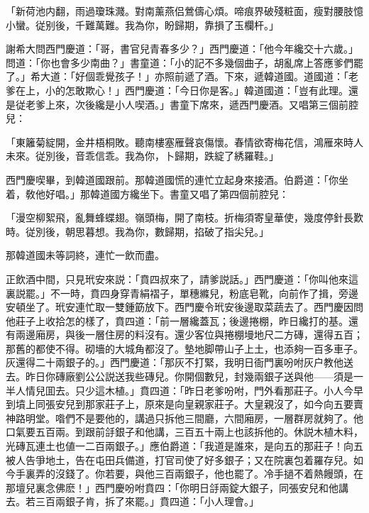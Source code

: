 \begin{myquote}
「新荷池内翻，雨過瓊珠濺。對南薰燕侣鶯儔心煩。啼痕界破殘粧面，瘦對腰肢憶小蠻。従别後，千難萬難。我為你，盼歸期，靠損了玉欄杆。」
\end{myquote}

謝希大問西門慶道：「哥，書官兒青春多少？」西門慶道：「他今年纔交十六歲。」問道：「你也會多少南曲？」書童道：「小的記不多幾個曲子，胡亂席上答應爹們罷了。」希大道：「好個乖覺孩子！」亦照前遞了酒。下來，遞韓道國。道國道：「老爹在上，小的怎敢欺心！」西門慶道：「今日你是客。」韓道國道：「豈有此理。還是従老爹上來，次後纔是小人喫酒。」書童下席來，遞西門慶酒。又唱第三個前腔兒：

\begin{myquote}
「東籬菊綻開，金井梧桐敗。聽南樓塞雁聲哀傷懷。春情欲寄梅花信，鴻雁來時人未來。従別後，音乖信乖。我為你，卜歸期，跌綻了綉羅鞋。」
\end{myquote}

西門慶喫畢，到韓道國跟前。那韓道國慌的連忙立起身來接酒。伯爵道：「你坐着，敎他好唱。」那韓道國方纔坐下。書童又唱了第四個前腔兒：

\begin{myquote}
「漫空柳絮飛，亂舞蜂蝶翅。嶺頭梅，開了南枝。折梅須寄皇華使，幾度停針長歎時。従別後，朝思暮想。我為你，數歸期，掐破了指尖兒。」
\end{myquote}

那韓道國未等詞終，連忙一飲而盡。

正飲酒中間，只見玳安來説：「賁四叔來了，請爹説話。」西門慶道：「你叫他來這裏説罷。」不一時，賁四身穿青絹褶子，單穗縧兒，粉底皂靴，向前作了揖，旁邊安頓坐了。玳安連忙取一雙鍾筯放下。西門慶令玳安後邊取菜蔬去了。西門慶因問他莊子上收拾怎的樣了，賁四道：「前一層纔蓋瓦；後邊捲棚，昨日纔打的基。還有兩邊廂房，與後一層住房的料沒有。還少客位與捲棚墁地尺二方磚，還得五百；那舊的都使不得。砌墻的大城角都沒了。墊地脚帶山子上土，也添夠一百多車子。灰還得二十兩銀子的。」西門慶道：「那灰不打緊，我明日衙門裏吩咐灰户教他送去。昨日你磚廠劉公公説送我些磚兒。你開個數兒，封幾兩銀子送與他——須是一半人情兒囬去。只少這木植。」賁四道：「昨日老爹吩咐，門外看那莊子。小人今早到墳上同張安兒到那家莊子上，原來是向皇親家莊子。大皇親沒了，如今向五要賣神路明堂。喒們不是要他的，講過只拆他三間廳，六間廂房，一層群房就夠了。他口氣要五百兩。到跟前㧱銀子和他講，三百五十兩上也該拆他的。休説木植木料，光磚瓦連土也値一二百兩銀子。」應伯爵道：「我道是誰來，是向五的那莊子！向五被人告爭地土，告在屯田兵備道，打官司使了好多銀子；又在院裏包着羅存兒。如今手裏弄的沒錢了。你若要，與他三百兩銀子，他也罷了。冷手撾不着熱饅頭，在那壇兒裏念佛麽！」西門慶吩咐賁四：「你明日㧱兩錠大銀子，同張安兒和他講去。若三百兩銀子肯，拆了來罷。」賁四道：「小人理會。」

